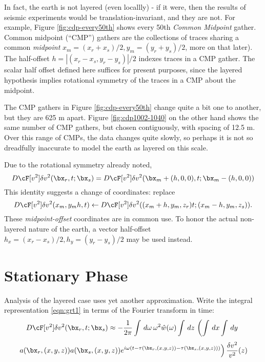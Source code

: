 In fact, the earth is not layered (even locallly) - if it were, then the results of seismic experiments would be translation-invariant, and they are not. For example, Figure \ref{fig:cdp-every50th} shows every 50th {\em Common Midpoint} gather. Common midpoint (``CMP'') gathers are the collections of traces sharing a common {\em midpoint} $x_m=(x_r+x_s)/2, y_m=(y_r+y_s)/2$, more on that later).
The half-offset $h=|(x_r-x_s,y_r-y_s)|/2$ indexes traces in a CMP gather. The scalar half offset defined here suffices for present purposes, since the layered hypothesis implies rotational symmetry of the traces in a CMP about the midpoint.

The CMP gathers in Figure \ref{fig:cdp-every50th} change quite a bit one to another, but they are 625 m apart. Figure \ref{fig:cdp1002-1040} on the other hand shows the same number of CMP gathers, but chosen contiguously, with spacing of 12.5 m. Over this range of CMPs, the data changes quite slowly, so perhaps it is not so dreadfully inaccurate to model the earth as layered on this scale.

Due to the rotational symmetry already noted,
\begin{equation}
\label{eqn:cmpdf}
D\cF[v^2]\delta v^2(\bx_r,t;\bx_s) = D\cF[v^2]\delta v^2(\bx_m + (h,0,0),t; \bx_m-(h,0,0))
\end{equation}
This identity suggests a change of coordinates: replace
\begin{equation}
\label{eqn:cmpdfc}
D\cF[v^2]\delta v^2(x_m,y_mh,t) \leftarrow D\cF[v^2]\delta v^2((x_m + h,y_m,z_r)t; (x_m-h,y_m,z_s)).
\end{equation}
These {\em midpoint-offset} coordinates are in common use. To honor the actual non-layered nature of the earth, a vector half-offset $h_x = (x_r-x_s)/2, h_y=(y_r-y_s)/2$ may be used instead.

\section{Stationary Phase}
Analysis of the layered case uses yet another approximation. Write the integral representation \ref{eqn:grt1} in terms of the Fourier transform in time: 
\[
D\cF[v^2]\delta v^2(\bx_r,t;\bx_s) \approx -\frac{1}{2\pi}\int\, d\omega \,\omega^2\hat{w}(\omega)\int \,dz \,\left( \int\,dx\int\,dy \, \right.
\]
\begin{equation}
\label{eqn:grt2}
\left. a(\bx_r,(x,y,z))a(\bx_s,(x,y,z))e^{i\omega(t-\tau(\bx_r,(x,y,z))-\tau(\bx_s,(x,y,z)))}\right)\frac{\delta v^2}{v^2}(z)
\end{equation}

